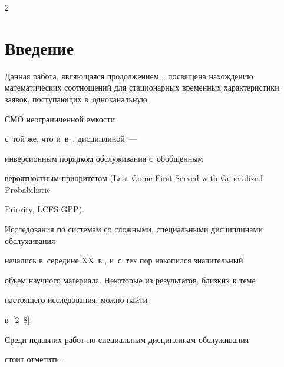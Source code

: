 




\vspace*{-6pt}













\thispagestyle{headings}





\begin{multicols}{2}





\label{st\stat}





\section{Введение}





Данная работа, являющаяся продолжением~\cite{lataavrv}, посвящена нахождению математических соотношений для стационарных временн$\acute{\mbox{ы}}$х характеристики заявок, поступающих в~одноканальную


СМО неограниченной емкости


с~той же, что и~в~\cite{lataavrv}, дисциплиной~---


инверсионным порядком обслуживания с~обобщенным


вероятностным приоритетом (Last Come First Served with Generalized Probabilistic


Priority, {LCFS GPP}).


Исследования по системам со сложными, специальными дисциплинами обслуживания


начались в~середине XX~в., и~с~тех пор накопился значительный


объем научного материала. Некоторые из результатов, близких к теме


настоящего исследования, можно найти


в~[2--8].


Среди недавних работ по специальным дисциплинам обслуживания


стоит отметить~\cite{jawbz, jawbz1}.






\end{multicols}
